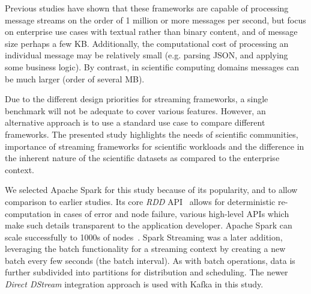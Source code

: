 \documentclass[conference]{IEEEtran}
\begin{document}
Previous studies have shown that these frameworks are capable of processing message streams on the order of 1 million or more messages per second, but focus on enterprise use cases with textual rather than binary content, and of message size perhaps a few KB. Additionally, the computational cost of processing an individual message may be relatively small (e.g. parsing JSON, and applying some business logic). By contrast, in scientific computing domains messages can be much larger (order of several MB).

Due to the different design priorities for streaming frameworks, a single benchmark will not be adequate to cover various features. However, an alternative approach is to use a standard use case to compare different frameworks. The presented study highlights the needs of scientific communities, importance of streaming frameworks for scientific workloads and the difference in the inherent nature of the scientific datasets as compared to the enterprise context.

We selected Apache Spark for this study because of its popularity, and to allow comparison to earlier studies. Its core \emph{RDD} API~\cite{Zaharia:2012:RDD:2228298.2228301} allows for deterministic re-computation in cases of error and node failure, various high-level APIs which make such details transparent to the application developer. Apache Spark can scale successfully to 1000s of nodes~\cite{xinApacheSparkFastest2014}. Spark Streaming was a later addition, leveraging the batch functionality for a streaming context by creating a new batch every few seconds (the batch interval). As with batch operations, data is further subdivided into partitions for distribution and scheduling. The newer \emph{Direct DStream} integration approach is used with Kafka in this study. 






\end{document}
